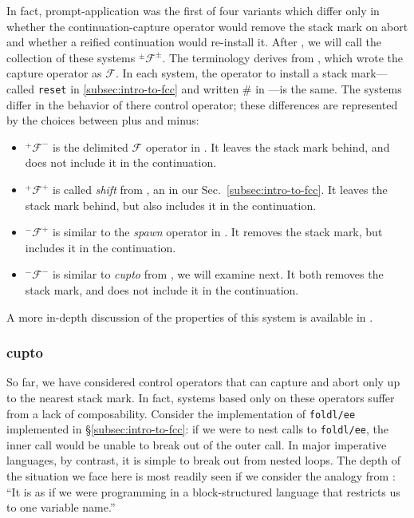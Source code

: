 \documentclass[11pt]{article}
\newcommand{\maybePage}{\newpage}
\newcommand\F{\mathcal{F}}
\newcommand\pmFpm{^\pm\F^\pm}
\begin{document}
In fact, prompt-application was the first of four variants which differ only in whether the continuation-capture operator would remove the stack mark on abort and whether a reified continuation would re-install it.
After \cite{MFDC}, we will call the collection of these systems $\pmFpm$.
The terminology derives from \cite{PromptApplication}, which wrote the capture operator as $\mathcal{F}$.
In each system, the operator to install a stack mark---called \texttt{reset} in \ref{subsec:intro-to-fcc} and written $\#$ in \cite{PromptApplication}---is the same.
The systems differ in the behavior of there control operator; these differences are represented by the choices between plus and minus:
\begin{itemize}
\item $^+\mathcal{F}^-$ is the delimited $\mathcal{F}$ operator in \cite{PromptApplication}. It leaves the stack mark behind, and does not include it in the continuation.
\item $^+\mathcal{F}^+$ is called \emph{shift} from \cite{AbstractingControl}, an in our Sec.~\ref{subsec:intro-to-fcc}. It leaves the stack mark behind, but also includes it in the continuation.
\item $^-\mathcal{F}^+$ is similar to the \emph{spawn} operator in \cite{ContinuationsAndConcurrency}. It removes the stack mark, but includes it in the continuation.
\item $^-\mathcal{F}^-$ is similar to \emph{cupto} from \cite{Gunter:1995}, we will examine next. It both removes the stack mark, and does not include it in the continuation.
\end{itemize}
A more in-depth discussion of the properties of this system is available in \cite{MFDC}.

\maybePage
\subsubsection{cupto}
\label{subsec:cupto}

So far, we have considered control operators that can capture and abort only up to the nearest stack mark.
In fact, systems based only on these operators suffer from a lack of composability.
Consider the implementation of \texttt{foldl/ee} implemented in \S\ref{subsec:intro-to-fcc}: if we were to nest calls to \texttt{foldl/ee}, the inner call would be unable to break out of the outer call.
In major imperative languages, by contrast, it is simple to break out from nested loops.
The depth of the situation we face here is most readily seen if we consider the analogy from \cite{ContinuationsAndConcurrency}: ``It is as if we were programming in a block-structured language that restricts us to one variable name.''
\end{document}

